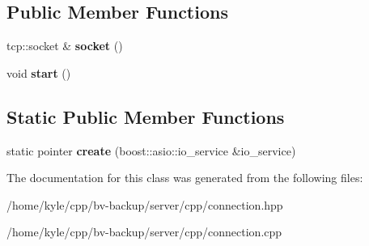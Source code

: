 \subsection*{Public Member Functions}
\begin{DoxyCompactItemize}
\item 
\mbox{\label{class_backup_1_1_networking_1_1_connection_a40dadb7d0b36d9359ef957eae9800876}} 
tcp\+::socket \& {\bfseries socket} ()
\item 
\mbox{\label{class_backup_1_1_networking_1_1_connection_a47c25a31352a71e2a6902d37fc5fa2ba}} 
void {\bfseries start} ()
\end{DoxyCompactItemize}
\subsection*{Static Public Member Functions}
\begin{DoxyCompactItemize}
\item 
\mbox{\label{class_backup_1_1_networking_1_1_connection_a59b5460afc3e0637baedfaae94bb9a75}} 
static pointer {\bfseries create} (boost\+::asio\+::io\+\_\+service \&io\+\_\+service)
\end{DoxyCompactItemize}


The documentation for this class was generated from the following files\+:\begin{DoxyCompactItemize}
\item 
/home/kyle/cpp/bv-\/backup/server/cpp/connection.\+hpp\item 
/home/kyle/cpp/bv-\/backup/server/cpp/connection.\+cpp\end{DoxyCompactItemize}
